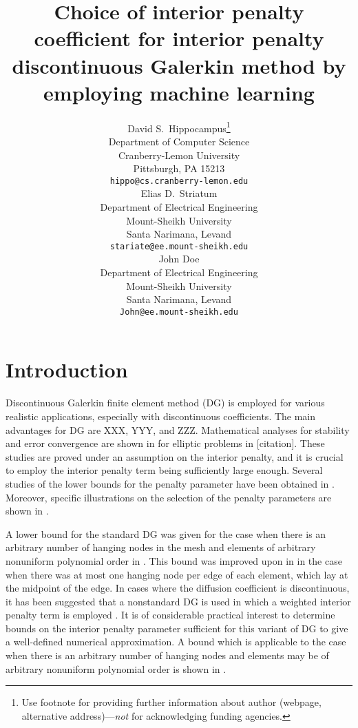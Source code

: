 \documentclass{article}
\title{Choice of interior penalty coefficient for interior penalty discontinuous Galerkin method by employing machine learning}
\author{
  David S.~Hippocampus\thanks{Use footnote for providing further
    information about author (webpage, alternative
    address)---\emph{not} for acknowledging funding agencies.} \\
  Department of Computer Science\\
  Cranberry-Lemon University\\
  Pittsburgh, PA 15213 \\
  \texttt{hippo@cs.cranberry-lemon.edu} \\
   \And
 Elias D.~Striatum \\
  Department of Electrical Engineering\\
  Mount-Sheikh University\\
  Santa Narimana, Levand \\
  \texttt{stariate@ee.mount-sheikh.edu} \\
  \And
 John Doe \\
  Department of Electrical Engineering\\
  Mount-Sheikh University\\
  Santa Narimana, Levand \\
  \texttt{John@ee.mount-sheikh.edu} \\
}
\begin{document}
\maketitle

\begin{abstract}
\lipsum[1]
\end{abstract}




\section{Introduction}

Discontinuous Galerkin finite element method (DG) is employed for various realistic applications, especially with discontinuous coefficients. The main advantages for DG are XXX, YYY, and ZZZ. Mathematical analyses for stability and error convergence are shown in for elliptic problems in [citation]. 
These studies are proved under an assumption on the interior penalty, and it is   crucial to employ the interior penalty term being sufficiently large enough. 
Several studies of the lower bounds for the penalty parameter have been obtained in \cite{ainsworth2007posteriori,ainsworth2010fully,ainsworth2009constant,epshteyn2007estimation,shahbazi2005explicit}. Moreover, specific illustrations on the selection of the penalty parameters are shown in \cite{ainsworth2012note}.


A lower bound for the standard DG was given for the case when there is an arbitrary number of hanging nodes in the mesh and elements of arbitrary nonuniform polynomial order in \cite{shahbazi2005explicit}.
This bound was improved upon in \cite{ainsworth2009constant} in the case when there was at most one hanging node per edge of each element, which lay at the midpoint of the edge. 
In cases where the diffusion coefficient is discontinuous, it has been suggested that a nonstandard DG is used in which a weighted interior penalty term is employed \cite{ern2008posteriori,ern2009discontinuous}. 
It is of considerable practical interest to
determine bounds on the interior penalty parameter sufficient for this variant of DG to give
a well-defined numerical approximation. 
A bound which is
applicable to the case when there is an arbitrary number of hanging nodes and elements may be of arbitrary nonuniform polynomial order is shown in  \cite{ainsworth2012note}.
\end{document}
